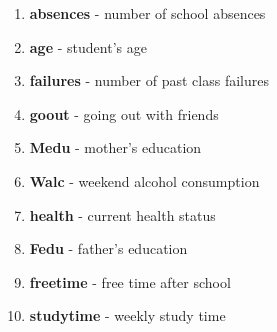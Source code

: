 \documentclass[12pt]{article}
\begin{document}
\begin{itemize}
\begin{enumerate}
 \item \textbf{absences} - number of school absences
 \item \textbf{age} - student's age 
 \item \textbf{failures} - number of past class failures
 \item \textbf{goout} - going out with friends
 \item \textbf{Medu} - mother's education
 \item \textbf{Walc} - weekend alcohol consumption
 \item \textbf{health} - current health status
 \item \textbf{Fedu} - father's education
 \item \textbf{freetime} - free time after school
 \item \textbf{studytime} - weekly study time
 \end{enumerate}

\end{itemize} 



\end{document}

